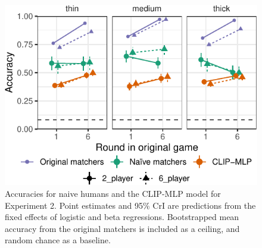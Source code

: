 \documentclass[10pt, letterpaper]{article}
\begin{document}
\begin{CodeChunk}
\begin{figure}[t]

{\centering \includegraphics[width=1\linewidth]{figs/fig-condition-1} 

}

\caption[Accuracies for naive humans and the CLIP-MLP model for Experiment 2]{Accuracies for naive humans and the CLIP-MLP model for Experiment 2. Point estimates and 95\% CrI are predictions from the fixed effects of logistic and beta regressions. Bootstrapped mean accuracy from the original matchers is included as a ceiling, and random chance as a baseline. \label{expt2-condition}}\label{fig:fig-condition}
\end{figure}
\end{CodeChunk}
\end{document}
